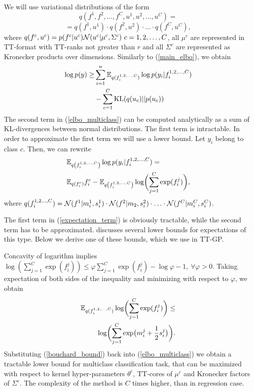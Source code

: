   We will use variational distributions of the form
  \[
    q(f^1, f^2, \ldots, f^C, u^1, u^2, \ldots, u^C) =
  \]
  \[
    = q(f^1, u^1) \cdot q(f^2, u^2) \cdot \ldots \cdot q(f^C, u^C),
  \]
  where $q(f^c, u^c) = p(f^c | u^c) \mathcal{N}(u^c | \mu^c, \Sigma^c)\ c=1, 2, \ldots, C$,
  all $\mu^c$ are represented in TT-format with TT-ranks not greater than $r$
  and all  $\Sigma^c$ are represented as Kronecker products over dimensions. 
  Similarly to (\ref{main_elbo}), we obtain
  \begin{equation}
  \label{elbo_multiclass}
  \begin{split}
    \log p(y) \ge & \sum_{i = 1}^n \mathbb{E}_{q(f_i^{1, 2, \ldots, C})} \log p(y_i | f_i^{1, 2, \ldots, C})
    \\
    & - \sum_{c = 1}^{C} \mbox{KL}(q(u_c) || p(u_c))
  \end{split}
  \end{equation}
  The second term in (\ref{elbo_multiclass}) can be computed analytically as
  a sum of KL-divergences between normal distributions. The first term is
  intractable. In order to approximate the first term we will use a lower bound.
  Let $y_i$ belong to class $c$. Then, we can rewrite
  \begin{equation}
  \label{expectation_term}
  \begin{split}
    &\mathbb{E}_{q\left(f_i^{1, 2, \ldots, C}\right)} \log p(y_i | f_i^{1, 2, \ldots, C}) =\\
    &\mathbb{E}_{q(f_i^c)} f_i^c - \mathbb{E}_{q\left(f_i^{1, 2, \ldots, C}\right)}
    \log \biggl(\sum_{j=1}^C \exp (f_i^j) \biggr),
  \end{split}
  \end{equation}
  where $q(f_i^{1, 2\ldots, C}) = \mathcal{N}(f^1 | m_i^1, s_i^1)\cdot \mathcal{N}(f^2| m_2, s_i^2) \cdot \ldots \cdot \mathcal{N}(f^C | m_i^C, s_i^C)$.

  The first term in (\ref{expectation_term}) is obviously tractable, while the
  second term has to be approximated. \citet{bouchard2007} discusses several
  lower bounds for expectations of this type. Below we derive one of these bounds,
  which we use in TT-GP.

  Concavity of logarithm implies $\log\left(\sum_{j=1}^{C} \exp(f_i^j)\right) \le 
  \varphi \sum_{j=1}^C \exp(f_i^j) - \log \varphi - 1,\ \forall\varphi > 0$. 
  Taking expectation of both sides of the inequality and minimizing with respect
  to $\varphi$, we obtain
  \begin{equation}
  \label{bouchard_bound}
  \begin{split}
    \mathbb{E}_{q(f_i^{1, 2, \ldots, C})} \log\biggl(\sum_{j=1}^C \exp(f_i^j)\biggr) \le
    \\
    \log \biggl(\sum_{j=1}^C \exp\bigl(m_i^j + \frac 1 2 s_i^j\bigr) \biggr).
  \end{split}
  \end{equation}
  Substituting (\ref{bouchard_bound}) back into (\ref{elbo_multiclass}) we obtain
  a tractable lower bound for multiclass classification task, that can be
  maximized with respect to kernel hyper-parameters $\theta^c$, TT-cores of
  $\mu^c$ and Kronecker factors of $\Sigma^c$. The complexity of the method
  is $C$ times higher, than in regression case.

